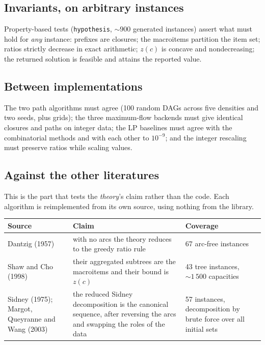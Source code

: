 \documentclass[11pt,a4paper]{article}
\newcommand{\code}[1]{\texttt{#1}}
\begin{document}
\subsection{Invariants, on arbitrary instances}

Property-based tests (\code{hypothesis}, $\sim900$ generated instances) assert
what must hold for \emph{any} instance: prefixes are closures; the macroitems
partition the item set; ratios strictly decrease in exact arithmetic; $z(c)$
is concave and nondecreasing; the returned solution is feasible and attains
the reported value.

\subsection{Between implementations}

The two path algorithms must agree (100 random DAGs across five densities and
two seeds, plus grids); the three maximum-flow backends must give identical
closures and paths on integer data; the LP baselines must agree with the
combinatorial methods and with each other to $10^{-9}$; and the integer
rescaling must preserve ratios while scaling values.

\subsection{Against the other literatures}

This is the part that tests the \emph{theory}'s claim rather than the code.
Each algorithm is reimplemented from its own source, using nothing from the
library.

\begin{center}
\begin{tabular}{@{}p{}p{}p{}@{}}
\toprule
\textbf{Source} & \textbf{Claim} & \textbf{Coverage}\\
\midrule
Dantzig (1957) & with no arcs the theory reduces to the greedy ratio rule &
67 arc-free instances\\
\addlinespace
Shaw and Cho (1998) & their aggregated subtrees are the macroitems and their
bound is $z(c)$ & 43 tree instances, $\sim1\,500$ capacities\\
\addlinespace
Sidney (1975); Margot, Queyranne and Wang (2003) & the reduced Sidney
decomposition is the canonical sequence, after reversing the arcs and
swapping the roles of the data & 57 instances, decomposition by brute force
over all initial sets\\
\bottomrule
\end{tabular}
\end{center}
\end{document}
